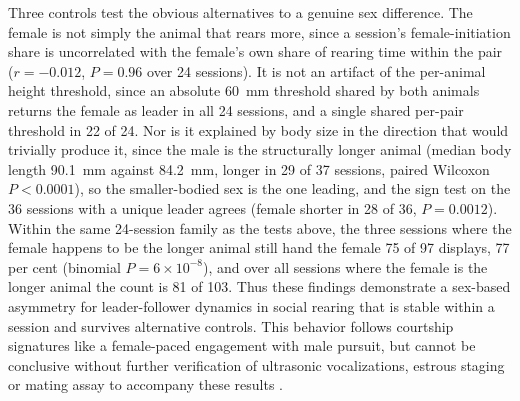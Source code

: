 \documentclass[pdflatex, sn-nature]{sn-jnl}
\theoremstyle{thmstyleone}%
\theoremstyle{thmstyletwo}%
\theoremstyle{thmstylethree}%
\begin{document}
Three controls test the obvious alternatives to a genuine sex difference. The female is not simply the animal that rears more, since a session's female-initiation share is uncorrelated with the female's own share of rearing time within the pair ($r = -0.012$, $P = 0.96$ over 24 sessions). It is not an artifact of the per-animal height threshold, since an absolute 60~mm threshold shared by both animals returns the female as leader in all 24 sessions, and a single shared per-pair threshold in 22 of 24. Nor is it explained by body size in the direction that would trivially produce it, since the male is the structurally longer animal (median body length 90.1~mm against 84.2~mm, longer in 29 of 37 sessions, paired Wilcoxon $P < 0.0001$), so the smaller-bodied sex is the one leading, and the sign test on the 36 sessions with a unique leader agrees (female shorter in 28 of 36, $P = 0.0012$). Within the same 24-session family as the tests above, the three sessions where the female happens to be the longer animal still hand the female 75 of 97 displays, 77 per cent (binomial $P = 6 \times 10^{-8}$), and over all sessions where the female is the longer animal the count is 81 of 103. Thus these findings demonstrate a sex-based asymmetry for leader-follower dynamics in social rearing that is stable within a session and survives alternative controls. This behavior follows courtship signatures like a female-paced engagement with male pursuit, but cannot be conclusive without further verification of ultrasonic vocalizations, estrous staging or mating assay to accompany these results \citep{Dias2025}.  
\end{document}
